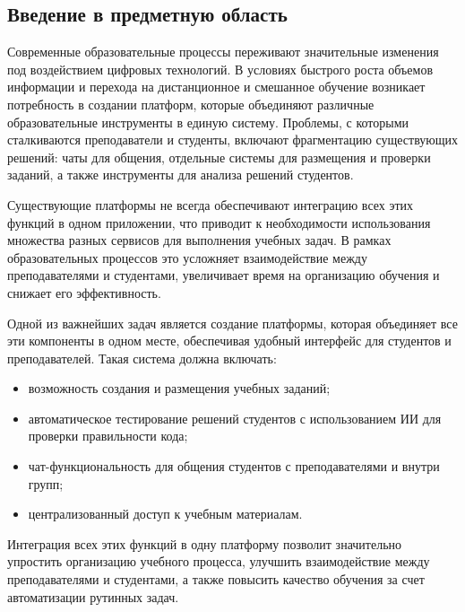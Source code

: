 \subsection{Введение в предметную область}

Современные образовательные процессы переживают значительные изменения под воздействием цифровых технологий. В условиях быстрого роста объемов информации и перехода на дистанционное и смешанное обучение возникает потребность в создании платформ, которые объединяют различные образовательные инструменты в единую систему. Проблемы, с которыми сталкиваются преподаватели и студенты, включают фрагментацию существующих решений: чаты для общения, отдельные системы для размещения и проверки заданий, а также инструменты для анализа решений студентов.

Существующие платформы не всегда обеспечивают интеграцию всех этих функций в одном приложении, что приводит к необходимости использования множества разных сервисов для выполнения учебных задач. В рамках образовательных процессов это усложняет взаимодействие между преподавателями и студентами, увеличивает время на организацию обучения и снижает его эффективность.

Одной из важнейших задач является создание платформы, которая объединяет все эти компоненты в одном месте, обеспечивая удобный интерфейс для студентов и преподавателей. Такая система должна включать:
\begin{itemize}
  \item возможность создания и размещения учебных заданий;
  \item автоматическое тестирование решений студентов с использованием ИИ для проверки правильности кода;
  \item чат-функциональность для общения студентов с преподавателями и внутри групп;
  \item централизованный доступ к учебным материалам.
\end{itemize}

Интеграция всех этих функций в одну платформу позволит значительно упростить организацию учебного процесса, улучшить взаимодействие между преподавателями и студентами, а также повысить качество обучения за счет автоматизации рутинных задач.